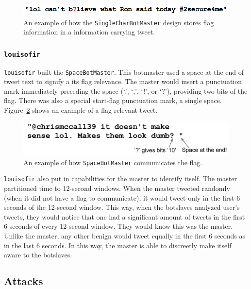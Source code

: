 \documentclass[11pt, oneside]{article} %
\numberwithin{equation}{section} %
\numberwithin{figure}{section} %
\numberwithin{table}{section} %
\renewcommand{\c}[1]{\texttt{#1}}
\newcommand{\teamol}{\c{louisofir}}
\begin{document}
		 \begin{figure}[H]
		    \center\includegraphics[scale=0.60]{resources/prng-tweet-ex.png}
		    \caption{An example of how the \c{SingleCharBotMaster} design stores flag information in a information carrying tweet.}
		    \label{fig:prng-tweet-ex}
		 \end{figure}
		
			
		\subsubsection{\teamol{}}
			\teamol{} built the \c{SpaceBotMaster}. This botmaster used a space at the end of tweet text to signify a its flag relevance. The master would insert a punctuation mark immediately preceding the space (`.', `,', `!', or `?'), providing two bits of the flag. There was also a special start-flag punctuation mark, a single space. Figure~\ref{fig:spacebot} shows an example of a flag-relevant tweet.
            
            \begin{figure}[H]
		    \center\includegraphics[scale=0.60]{resources/spacebot.png}
		    \caption{An example of how \c{SpaceBotMaster} communicates the flag.}
		    \label{fig:spacebot}
		 \end{figure}

			\teamol{} also put in capabilities for the master to identify itself. The master partitioned time to 12-second windows. When the master tweeted randomly (when it did not have a flag to communicate), it would tweet only in the first 6 seconds of the 12-second window. This way, when the botslaves analyzed user's tweets, they would notice that one had a significant amount of tweets in the first 6 seconds of every 12-second window. They would know this was the master. Unlike the master, any other benign would tweet equally in the first 6 seconds as in the last 6 seconds. In this way, the master is able to discreetly make itself aware to the botslaves.

	\subsection{Attacks}
\end{document}
